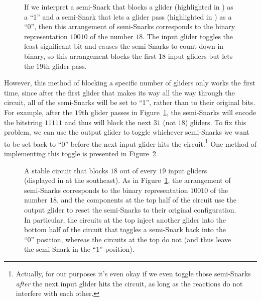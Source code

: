\begin{figure}[!htb]
	\centering
	\caption{If we interpret a semi-Snark that blocks a glider (highlighted in ) as a ``1'' and a semi-Snark that lets a glider pass (highlighted in ) as a ``0'', then this arrangement of semi-Snarks corresponds to the binary representation $10010$ of the number $18$. The input glider toggles the least significant bit and causes the semi-Snarks to count down in binary, so this arrangement blocks the first $18$ input gliders but lets the $19$th glider pass.}
	\label{fig:block_18_gliders}
\end{figure}

However, this method of blocking a specific number of gliders only works the first time, since after the first glider that makes its way all the way through the circuit, all of the semi-Snarks will be set to ``1'', rather than to their original bits. For example, after the $19$th glider passes in Figure~\ref{fig:block_18_gliders}, the semi-Snarks will encode the bitstring $11111$ and thus will block the next $31$ (not $18$) gliders. To fix this problem, we can use the output glider to toggle whichever semi-Snarks we want to be set back to ``0'' before the next input glider hits the circuit.\footnote{Actually, for our purposes it's even okay if we even toggle those semi-Snarks \emph{after} the next input glider hits the circuit, as long as the reactions do not interfere with each other.} One method of implementing this toggle is presented in Figure~\ref{fig:block_18_gliders_repeatable}.

\begin{figure}[!htb]
	\centering
	\caption{A stable circuit that blocks $18$ out of every $19$ input gliders (displayed in  at the southeast). As in Figure~\ref{fig:block_18_gliders}, the arrangement of semi-Snarks corresponds to the binary representation $10010$ of the number $18$, and the components at the top half of the circuit use the output glider to reset the semi-Snarks to their original configuration. In particular, the  circuits at the top inject another glider into the bottom half of the circuit that toggles a semi-Snark back into the ``0'' position, whereas the  circuits at the top do not (and thus leave the semi-Snark in the ``1'' position).}
	\label{fig:block_18_gliders_repeatable}
\end{figure}

